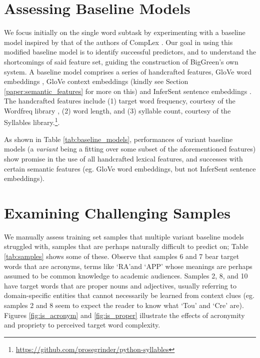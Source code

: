 \documentclass{dcthesis}
\theoremstyle{definition}
\theoremstyle{remark}
\begin{document}
\section{Assessing Baseline Models}

We focus initially on the single word subtask by experimenting with a baseline model inspired by that of the authors of CompLex \citep{shardlow2020complex}. Our goal in using this modified baseline model is to identify successful predictors, and to understand the shortcomings of said feature set, guiding the construction of BigGreen's own system. A baseline model comprises a series of handcrafted features, GloVe word embeddings \citep{pennington2014glove}, GloVe context embeddings (kindly see Section \ref{paper:semantic_features} for more on this) and InferSent sentence embeddings \citep{conneau2017supervised}. The handcrafted features include (1) target word frequency, courtesy of the Wordfreq library \citep{speer2018luminosoinsight}, (2) word length, and (3) syllable count, courtesy of the Syllables library.\footnote{\url{https://github.com/prosegrinder/python-syllables}}. 

As shown in Table \ref{tab:baseline_models}, performances of variant baseline models (a \textit{variant} being a fitting over some subset of the aforementioned features) show promise in the use of all handcrafted lexical features, and successes with certain semantic features (eg. GloVe word embeddings, but not InferSent sentence embeddings). 

\section{Examining Challenging Samples}

We manually assess training set samples that multiple variant baseline models struggled with, samples that are perhaps naturally difficult to predict on; Table \ref{tab:samples} shows some of these. Observe that samples 6 and 7 bear target words that are acronyms, terms like \lq{RA}\rq and \lq{APP}\rq{} whose meanings are perhaps assumed to be common knowledge to academic audiences. Samples 2, 8, and 10 have target words that are proper nouns and adjectives, usually referring to domain-specific entities that cannot necessarily be learned from context clues (eg. samples 2 and 8 seem to expect the reader to know what \lq{Tou}\rq{} and \lq{Cre}\rq{} are). Figures \ref{fig:is_acronym} and \ref{fig:is_proper} illustrate the effects of acronymity and propriety to perceived target word complexity.
\end{document}
